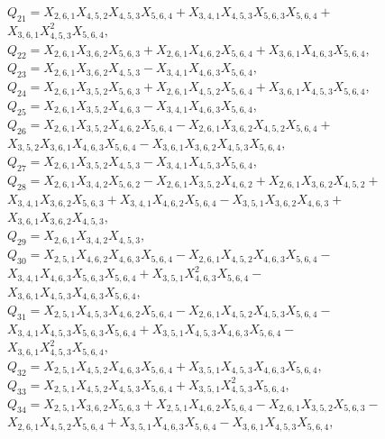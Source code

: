 \documentclass[10pt]{beamer}
\begin{document}
{$Q_{21}=X_{2,6,1}X_{4,5,2}X_{4,5,3}X_{5,6,4}+X_{3,4,1}X_{4,5,3}X_{5,6,3}X_{5,6,4}+$\\
$X_{3,6,1}X_{4,5,3}^2X_{5,6,4},$\\
$Q_{22}=X_{2,6,1}X_{3,6,2}X_{5,6,3}+X_{2,6,1}X_{4,6,2}X_{5,6,4}+X_{3,6,1}X_{4,6,3}X_{5,6,4},$\\
$Q_{23}=X_{2,6,1}X_{3,6,2}X_{4,5,3}-X_{3,4,1}X_{4,6,3}X_{5,6,4},$\\
$Q_{24}=X_{2,6,1}X_{3,5,2}X_{5,6,3}+X_{2,6,1}X_{4,5,2}X_{5,6,4}+X_{3,6,1}X_{4,5,3}X_{5,6,4},$\\
$Q_{25}=X_{2,6,1}X_{3,5,2}X_{4,6,3}-X_{3,4,1}X_{4,6,3}X_{5,6,4},$\\
$Q_{26}=X_{2,6,1}X_{3,5,2}X_{4,6,2}X_{5,6,4}-X_{2,6,1}X_{3,6,2}X_{4,5,2}X_{5,6,4}+$\\
$X_{3,5,2}X_{3,6,1}X_{4,6,3}X_{5,6,4}-X_{3,6,1}X_{3,6,2}X_{4,5,3}X_{5,6,4},$\\
$Q_{27}=X_{2,6,1}X_{3,5,2}X_{4,5,3}-X_{3,4,1}X_{4,5,3}X_{5,6,4},$\\
$Q_{28}=X_{2,6,1}X_{3,4,2}X_{5,6,2}-X_{2,6,1}X_{3,5,2}X_{4,6,2}+X_{2,6,1}X_{3,6,2}X_{4,5,2}+$\\
$X_{3,4,1}X_{3,6,2}X_{5,6,3}+X_{3,4,1}X_{4,6,2}X_{5,6,4}-X_{3,5,1}X_{3,6,2}X_{4,6,3}+$\\
$X_{3,6,1}X_{3,6,2}X_{4,5,3},$\\
$Q_{29}=X_{2,6,1}X_{3,4,2}X_{4,5,3},$\\
$Q_{30}=X_{2,5,1}X_{4,6,2}X_{4,6,3}X_{5,6,4}-X_{2,6,1}X_{4,5,2}X_{4,6,3}X_{5,6,4}-$\\
$X_{3,4,1}X_{4,6,3}X_{5,6,3}X_{5,6,4}+X_{3,5,1}X_{4,6,3}^2X_{5,6,4}-$\\
$X_{3,6,1}X_{4,5,3}X_{4,6,3}X_{5,6,4},$\\
$Q_{31}=X_{2,5,1}X_{4,5,3}X_{4,6,2}X_{5,6,4}-X_{2,6,1}X_{4,5,2}X_{4,5,3}X_{5,6,4}-$\\
$X_{3,4,1}X_{4,5,3}X_{5,6,3}X_{5,6,4}+X_{3,5,1}X_{4,5,3}X_{4,6,3}X_{5,6,4}-$\\
$X_{3,6,1}X_{4,5,3}^2X_{5,6,4},$\\
$Q_{32}=X_{2,5,1}X_{4,5,2}X_{4,6,3}X_{5,6,4}+X_{3,5,1}X_{4,5,3}X_{4,6,3}X_{5,6,4},$\\
$Q_{33}=X_{2,5,1}X_{4,5,2}X_{4,5,3}X_{5,6,4}+X_{3,5,1}X_{4,5,3}^2X_{5,6,4},$\\
$Q_{34}=X_{2,5,1}X_{3,6,2}X_{5,6,3}+X_{2,5,1}X_{4,6,2}X_{5,6,4}-X_{2,6,1}X_{3,5,2}X_{5,6,3}-$\\
$X_{2,6,1}X_{4,5,2}X_{5,6,4}+X_{3,5,1}X_{4,6,3}X_{5,6,4}-X_{3,6,1}X_{4,5,3}X_{5,6,4},$\\
}
\end{document}
